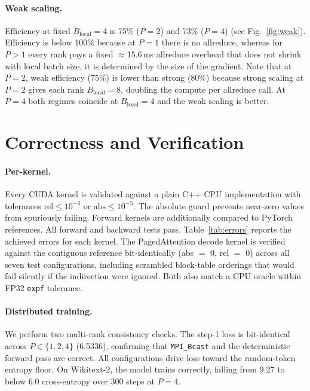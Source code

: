 \documentclass[11pt,letterpaper]{article}
\begin{document}
\paragraph{Weak scaling.}
Efficiency at fixed $B_\text{local}{=}4$ is 75\% ($P{=}2$) and 73\% ($P{=}4$) (see Fig.~\ref{fig:weak}).
Efficiency is below 100\% because at $P{=}1$ there is no allreduce, whereas
for $P{>}1$ every rank pays a fixed $\approx$15.6\,ms allreduce overhead that
does not shrink with local batch size, it is determined by the size of the gradient.
Note that at $P{=}2$, weak efficiency (75\%) is lower than strong (80\%) because strong
scaling at $P{=}2$ gives each rank $B_\text{local}{=}8$, doubling the compute
per allreduce call. At $P{=}4$ both regimes coincide at $B_\text{local}{=}4$ and the weak scaling is better.

\section{Correctness and Verification}

\paragraph{Per-kernel.}
Every CUDA kernel is validated against a plain C++ CPU implementation
with tolerances $\text{rel}\leq 10^{-3}$ or $\text{abs}\leq 10^{-5}$.
The absolute guard prevents near-zero values from spuriously failing.
Forward kernels are additionally compared to PyTorch references.
All forward and backward tests pass. Table~\ref{tab:errors} reports the
achieved errors for each kernel. The PagedAttention decode kernel is
verified against the contiguous reference bit-identically
(abs $=$ 0, rel $=$ 0) across all seven test configurations, including
scrambled block-table orderings that would fail silently if the
indirection were ignored. Both also match a CPU oracle within FP32
\texttt{expf} tolerance.

\paragraph{Distributed training.}
We perform two multi-rank consistency checks. The step-1 loss is
bit-identical across $P\in\{1,2,4\}$ (6.5336), confirming that
\texttt{MPI\_Bcast} and the deterministic forward pass are correct. All
configurations drive loss toward the random-token entropy floor.
On Wikitext-2, the model trains correctly, falling from 9.27 to below
6.0 cross-entropy over 300 steps at $P{=}4$.
\end{document}
